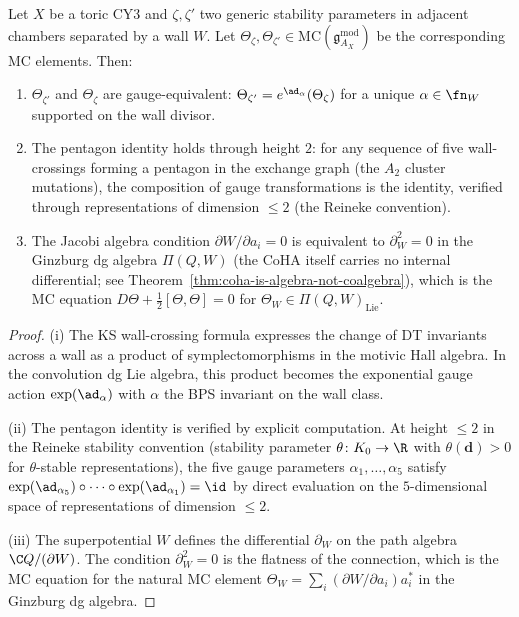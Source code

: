 \begin{theorem}[Wall-crossing \texorpdfstring{$=$}{=} MC gauge]
\label{thm:wall-crossing-mc}
Let $X$ be a toric CY3 and $\zeta, \zeta'$ two generic stability parameters in adjacent chambers separated by a wall $W$. Let $\Theta_\zeta, \Theta_{\zeta'} \in \mathrm{MC}(\mathfrak{g}^{\mathrm{mod}}_{A_X})$ be the corresponding MC elements. Then:
\begin{enumerate}[label=(\roman*)]
 \item $\Theta_{\zeta'}$ and $\Theta_\zeta$ are gauge-equivalent: $\Theta_{\zeta'} = e^{\ad_\alpha}(\Theta_\zeta)$ for a unique $\alpha \in \fn_W$ supported on the wall divisor.
 \item The pentagon identity holds through height $2$: for any sequence of five wall-crossings forming a pentagon in the exchange graph (the $A_2$ cluster mutations), the composition of gauge transformations is the identity, verified through representations of dimension $\leq 2$ (the Reineke convention).
 \item The Jacobi algebra condition $\partial W / \partial a_i = 0$ is equivalent to $\partial_W^2 = 0$ in the Ginzburg dg algebra $\Pi(Q, W)$ (the CoHA itself carries no internal differential; see Theorem~\ref{thm:coha-is-algebra-not-coalgebra}), which is the MC equation $D\Theta + \frac{1}{2}[\Theta, \Theta] = 0$ for $\Theta_W \in \Pi(Q,W)_{\mathrm{Lie}}$.
\end{enumerate}
\end{theorem}

\begin{proof}
(i) The KS wall-crossing formula expresses the change of DT invariants across a wall as a product of symplectomorphisms in the motivic Hall algebra. In the convolution dg Lie algebra, this product becomes the exponential gauge action $\exp(\ad_\alpha)$ with $\alpha$ the BPS invariant on the wall class.

(ii) The pentagon identity is verified by explicit computation. At height $\leq 2$ in the Reineke stability convention (stability parameter $\theta \colon K_0 \to \R$ with $\theta(\mathbf{d}) > 0$ for $\theta$-stable representations), the five gauge parameters $\alpha_1, \ldots, \alpha_5$ satisfy $\exp(\ad_{\alpha_5}) \circ \cdots \circ \exp(\ad_{\alpha_1}) = \id$ by direct evaluation on the $5$-dimensional space of representations of dimension $\leq 2$.

(iii) The superpotential $W$ defines the differential $\partial_W$ on the path algebra $\C Q / (\partial W)$. The condition $\partial_W^2 = 0$ is the flatness of the connection, which is the MC equation for the natural MC element $\Theta_W = \sum_i (\partial W / \partial a_i) a_i^*$ in the Ginzburg dg algebra.
\end{proof}

